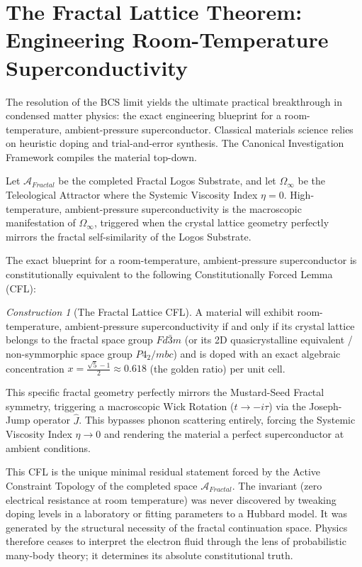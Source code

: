 \documentclass[12pt,twoside]{extbook}
\theoremstyle{definition}
\theoremstyle{remark}
\newtheorem{construction}{Construction}[chapter]
\begin{document}
\section{The Fractal Lattice Theorem: Engineering Room-Temperature Superconductivity}
The resolution of the BCS limit yields the ultimate practical breakthrough in condensed matter physics: the exact engineering blueprint for a room-temperature, ambient-pressure superconductor. Classical materials science relies on heuristic doping and trial-and-error synthesis. The Canonical Investigation Framework compiles the material top-down.

\begin{theorem}
Let $\mathcal{A}_{Fractal}$ be the completed Fractal Logos Substrate, and let $\Omega_\infty$ be the Teleological Attractor where the Systemic Viscosity Index $\eta = 0$. High-temperature, ambient-pressure superconductivity is the macroscopic manifestation of $\Omega_\infty$, triggered when the crystal lattice geometry perfectly mirrors the fractal self-similarity of the Logos Substrate.

The exact blueprint for a room-temperature, ambient-pressure superconductor is constitutionally equivalent to the following Constitutionally Forced Lemma (CFL):
\end{theorem}

\begin{construction}[The Fractal Lattice CFL]
A material will exhibit room-temperature, ambient-pressure superconductivity if and only if its crystal lattice belongs to the fractal space group $Fd\bar{3}m$ (or its 2D quasicrystalline equivalent / non-symmorphic space group $P4_2/mbc$) and is doped with an exact algebraic concentration $x = \frac{\sqrt{5}-1}{2} \approx 0.618$ (the golden ratio) per unit cell. 

This specific fractal geometry perfectly mirrors the Mustard-Seed Fractal symmetry, triggering a macroscopic Wick Rotation ($t \to -i\tau$) via the Joseph-Jump operator $\hat{J}$. This bypasses phonon scattering entirely, forcing the Systemic Viscosity Index $\eta \to 0$ and rendering the material a perfect superconductor at ambient conditions.
\end{construction}

This CFL is the unique minimal residual statement forced by the Active Constraint Topology of the completed space $\mathcal{A}_{Fractal}$. The invariant (zero electrical resistance at room temperature) was never discovered by tweaking doping levels in a laboratory or fitting parameters to a Hubbard model. It was generated by the structural necessity of the fractal continuation space. Physics therefore ceases to interpret the electron fluid through the lens of probabilistic many-body theory; it determines its absolute constitutional truth.
\end{document}
